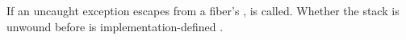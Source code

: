 \label{exceptions}

If an uncaught exception escapes from a fiber's \entryfn,
\termn is called.
Whether the stack is unwound before \termn is
implementation-defined .
